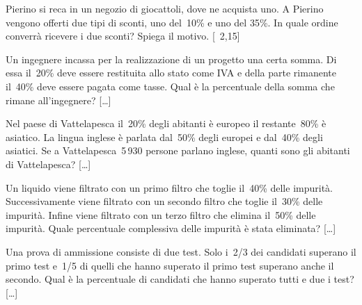 \begin{multicols}{2}
\begin{esercizio}
\label{ese:3.206}
Pierino si reca in un negozio di giocattoli, dove ne acquista uno. A
Pierino vengono offerti due tipi di sconti, uno del~10\% e uno del
35\%. In quale ordine converrà ricevere i due sconti? Spiega il
motivo. \hfill [\officialeuro\ 2,15]
\end{esercizio}


\begin{esercizio}
\label{ese:3.208}
Un ingegnere incassa per la realizzazione di un progetto una
certa somma. Di essa il~20\% deve essere restituita allo stato come IVA
e della parte rimanente il~40\% deve essere pagata come tasse. Qual è
la percentuale della somma che rimane all'ingegnere? \hfill [\dots]
\end{esercizio}

\begin{esercizio}
\label{ese:3.209}
Nel paese di Vattelapesca il~20\% degli abitanti è europeo il
restante~80\% è asiatico. La lingua inglese è parlata dal~50\% degli
europei e dal~40\% degli asiatici. Se a Vattelapesca~5\,930 persone
parlano inglese, quanti sono gli abitanti di Vattelapesca? \hfill [\dots]
\end{esercizio}

\begin{esercizio}
\label{ese:3.210}
Un liquido viene filtrato con un primo filtro che toglie il~40\%
delle impurità. Successivamente viene filtrato con un secondo filtro
che toglie il~30\% delle impurità. Infine viene filtrato con un terzo
filtro che elimina il~50\% delle impurità. Quale percentuale
complessiva delle impurità è stata eliminata? \hfill [\dots]
\end{esercizio}

\begin{esercizio}
\label{ese:3.211}
Una prova di ammissione consiste di due test. Solo i~2/3 dei
candidati superano il primo test e~1/5 di quelli che hanno superato il
primo test superano anche il secondo. Qual è la percentuale di
candidati che hanno superato tutti e due i test? \hfill [\dots]
\end{esercizio}


\end{multicols}
